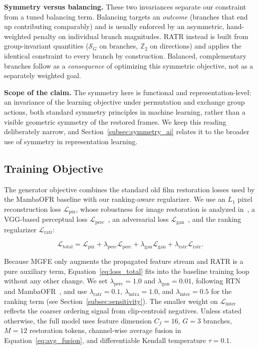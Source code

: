 \documentclass[symmetry,article,submit,pdftex,moreauthors]{Definitions/mdpi}
\begin{document}
\textbf{Symmetry versus balancing.} These two invariances separate our constraint from a tuned balancing term. Balancing targets an \emph{outcome} (branches that end up contributing comparably) and is usually enforced by an asymmetric, hand-weighted penalty on individual branch magnitudes. RATR instead is built from group-invariant quantities ($\mathcal{S}_G$ on branches, $\mathbb{Z}_2$ on directions) and applies the identical constraint to every branch by construction. Balanced, complementary branches follow as a \emph{consequence} of optimizing this symmetric objective, not as a separately weighted goal.

\textbf{Scope of the claim.} The symmetry here is functional and representation-level: an invariance of the learning objective under permutation and exchange group actions, both standard symmetry principles in machine learning, rather than a visible geometric symmetry of the restored frames. We keep this reading deliberately narrow, and Section~\ref{subsec:symmetry_ai} relates it to the broader use of symmetry in representation learning.

\subsection{Training Objective}
\label{subsec:training_objective}

The generator objective combines the standard old film restoration losses used by the MambaOFR baseline with our ranking-aware regularizer. We use an $L_1$ pixel reconstruction loss $\mathcal{L}_{\mathrm{pix}}$, whose robustness for image restoration is analyzed in~\cite{zhao2017loss_restoration}, a VGG-based perceptual loss $\mathcal{L}_{\mathrm{perc}}$~\cite{johnson2016perceptual}, an adversarial loss $\mathcal{L}_{\mathrm{gan}}$~\cite{goodfellow2014gan}, and the ranking regularizer $\mathcal{L}_{\mathrm{ratr}}$:

\begin{equation}
\mathcal{L}_{\mathrm{total}} =
\mathcal{L}_{\mathrm{pix}}
+ \lambda_{\mathrm{perc}}\mathcal{L}_{\mathrm{perc}}
+ \lambda_{\mathrm{gan}}\mathcal{L}_{\mathrm{gan}}
+ \lambda_{\mathrm{ratr}}\mathcal{L}_{\mathrm{ratr}}.
\label{eq:loss_total}
\end{equation}

Because MGFE only augments the propagated feature stream and RATR is a pure auxiliary term, Equation~\eqref{eq:loss_total} fits into the baseline training loop without any other change. We set $\lambda_{\mathrm{perc}}=1.0$ and $\lambda_{\mathrm{gan}}=0.01$, following RTN~\cite{wan2022rtn} and MambaOFR~\cite{mao2025mambaofr}, and use $\lambda_{\mathrm{ratr}}=0.1$, $\lambda_{\mathrm{intra}}=1.0$, and $\lambda_{\mathrm{inter}}=0.5$ for the ranking term (see Section~\ref{subsec:sensitivity}). The smaller weight on $\mathcal{L}_{\text{inter}}$ reflects the coarser ordering signal from clip-centroid negatives. Unless stated otherwise, the full model uses feature dimension $C_f=16$, $G=3$ branches, $M=12$ restoration tokens, channel-wise average fusion in Equation~\eqref{eq:avg_fusion}, and differentiable Kendall temperature $\tau=0.1$.
\end{document}

